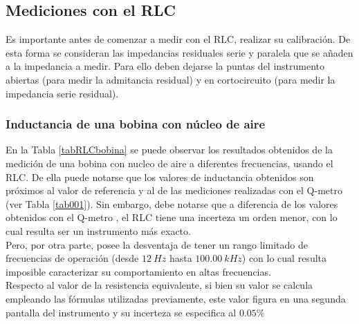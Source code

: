 \documentclass[a4paper,10pt]{article}
\begin{document}
		\subsection{Mediciones con el RLC}		
		Es importante antes de comenzar a medir con el RLC, realizar su calibraci\'on. De esta forma se consideran las impedancias residuales serie y paralela que se a\~naden a la impedancia a medir. Para ello deben dejarse la puntas del instrumento abiertas (para medir la admitancia residual) y en cortocircuito (para medir la impedancia serie residual).
		\subsubsection{Inductancia de una bobina con n\'ucleo de aire}
		\indent En la Tabla \ref{tabRLCbobina} se puede observar los resultados 
		obtenidos de la medici\'on de una bobina con nucleo de aire a diferentes
		frecuencias, usando el RLC. De ella puede notarse que los valores de 
		inductancia obtenidos son pr\'oximos al valor de referencia y al de las 
		mediciones realizadas con el Q-metro (ver Tabla \ref{tab001}). Sin 
		embargo, debe notarse que a diferencia de los valores obtenidos con el 
		Q-metro , el RLC tiene una incerteza un orden menor, con lo cual resulta
		ser un instrumento m\'as exacto. \\
		\indent Pero, por otra parte, posee la desventaja de tener un rango 
		limitado de frecuencias de operaci\'on (desde $12~Hz$ hasta 
		$100.00~kHz$) con lo cual resulta imposible caracterizar su 
		comportamiento en altas frecuencias. \\
		\indent Respecto al valor de la resistencia equivalente, si bien su 
		valor se calcula empleando las f\'ormulas utilizadas previamente, este 
		valor figura en una segunda pantalla del instrumento y su incerteza se 
		especifica al $0.05\%$
\end{document}
